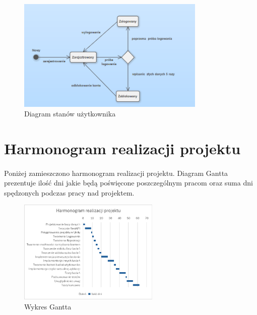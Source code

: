 \documentclass[12pt, letterpaper]{article}
\begin{document}
\begin{figure}[h]
  \centering
      \includegraphics[width=0.8\textwidth]{activeDiagramUser}
  \caption{Diagram stanów użytkownika}
\end{figure}
		
		
\newpage
\section{Harmonogram realizacji projektu}
\paragraph{}
Poniżej zamieszczono harmonogram realizacji projektu. Diagram Gantta prezentuje ilość dni jakie będą poświęcone poszczególnym pracom oraz suma dni spędzonych podczas pracy nad projektem.
		
\begin{figure}[h]
  \centering
      \includegraphics[width=0.6\textwidth]{wykres_gantta}
  \caption{Wykres Gantta}
\end{figure}
		
		
\end{document}
